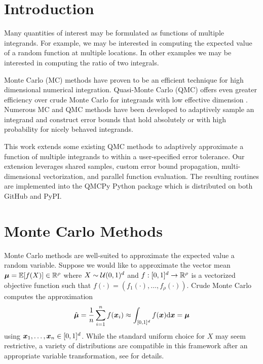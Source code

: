 \documentclass{article}[12pt]
\begin{document}
\newpage

\section{Introduction}

Many quantities of interest may be formulated as functions of multiple integrands. For example, we may be interested in computing the expected value of a random function at multiple locations. In other examples we may be interested in computing the ratio of two integrals.

Monte Carlo (MC) methods have proven to be an efficient technique for high dimensional numerical integration. Quasi-Monte Carlo (QMC) offers even greater efficiency over crude Monte Carlo for integrands with low effective dimension . Numerous MC and QMC methods have been developed to adaptively sample an integrand and construct error bounds that hold absolutely or with high probability for nicely behaved integrands. 

This work extends some existing QMC methods to adaptively approximate a function of multiple integrands to within a user-specified error tolerance. Our extension leverages shared samples, custom error bound propagation, multi-dimensional vectorization, and parallel function evaluation. The resulting routines are implemented into the QMCPy Python package \cite{QMCPy} which is distributed on both GitHub and PyPI. 

\section{Monte Carlo Methods}

Monte Carlo methods are well-suited to approximate the expected value a random variable. Suppose we would like to approximate the vector mean $\boldsymbol{\mu} = \mathbb{E}[f(X)] \in \mathbb{R}^\rho$ where $X\sim\mathcal{U}(0,1)^d$ and  $f: [0,1]^d \to \mathbb{R}^\rho$ is a vectorized objective function such that $f(\cdot)=(f_1(\cdot),\dots,f_\rho(\cdot))$.  Crude Monte Carlo computes the approximation 
\begin{equation}
    \label{eq:mcapprox}
    \hat{\boldsymbol{\mu}} = \frac{1}{n}\sum_{i=1}^n f(\boldsymbol{x}_i) \approx \int_{[0,1]^d}f(\boldsymbol{x})\mathrm{d}\boldsymbol{x} = \boldsymbol{\mu}
\end{equation}
using $\boldsymbol{x}_1,\dots,\boldsymbol{x}_n \in [0,1]^d$. While the standard uniform choice for $X$ may seem restrictive, a variety of distributions are compatible in this framework after an appropriate variable transformation, see \cite{QMCSoftware} for details.
\end{document}
